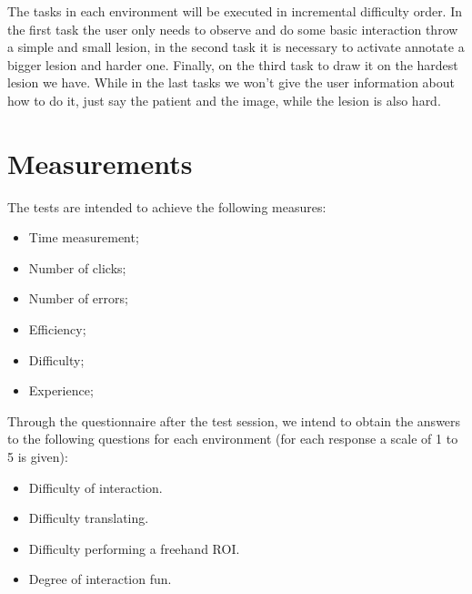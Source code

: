 \documentclass{article}
\begin{document}
The tasks in each environment will be executed in incremental difficulty order. In the first task the user only needs to observe and do some basic interaction throw a simple and small lesion, in the second task it is necessary to activate annotate a bigger lesion and harder one. Finally, on the third task to draw it on the hardest lesion we have. While in the last tasks we won't give the user information about how to do it, just say the patient and the image, while the lesion is also hard.

\clearpage

\section{Measurements}

The tests are intended to achieve the following measures:

\begin{itemize}
  \item Time measurement;
  \item Number of clicks;
  \item Number of errors;
  \item Efficiency;
  \item Difficulty;
  \item Experience;
\end{itemize}

Through the questionnaire after the test session, we intend to obtain the answers to the following questions for each environment (for each response a scale of 1 to 5 is given):

\begin{itemize}
  \item Difficulty of interaction.
  \item Difficulty translating.
  \item Difficulty performing a freehand ROI.
  \item Degree of interaction fun.
\end{itemize}
\end{document}
